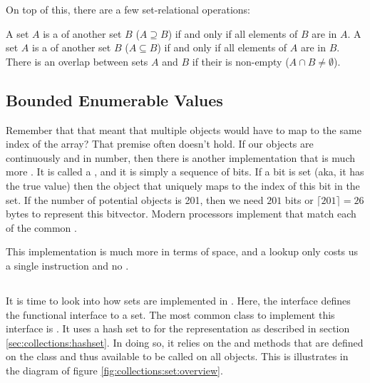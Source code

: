 On top of this, there are a few set-relational operations:

\begin{itemize}
   A set $A$ is a  of another set $B$ ($A \supseteq B$) if and only if all elements of $B$ are in $A$.
   A set $A$ is a  of another set $B$ ($A \subseteq B$) if and only if all elements of $A$ are in $B$.
   There is an overlap between sets $A$ and $B$ if their  is non-empty ($A \cap B \neq \emptyset$).
\end{itemize}

\subsection{Bounded Enumerable Values}

Remember that  that meant that multiple objects would have to map to the same index of the array? That premise often doesn't hold. If our objects are continuously  and  in number, then there is another implementation that is much more . It is called a , and it is simply a sequence of bits. If a bit is set (aka, it has the true value) then the object that uniquely maps to the index of this bit in the set. If the number of potential objects is 201, then we need $201$ bits or $\lceil 201 \rceil = 26$ bytes to represent this bitvector. Modern processors implement  that match each of the common .

This implementation is much more  in terms of space, and a lookup only costs us a single  instruction and no .

\subsection{\csharp}

It is time to look into how sets are implemented in \csharp. Here, the  interface defines the functional interface to a set. The most common class to implement this interface is . It uses a hash set to for the representation as described in section \ref{sec:collections:hashset}. In doing so, it relies on the  and  methods that are defined on the  class and thus available to be called on all objects. This is illustrates in the  diagram of figure \ref{fig:collections:set:overview}.

